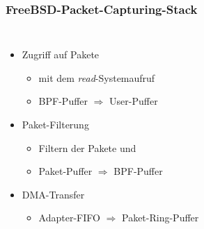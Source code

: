 \documentclass{beamer}
\begin{document}
\begin{frame}
\frametitle{FreeBSD-Packet-Capturing-Stack}
\begin{columns}
\vspace{0em}
\begin{itemize}
\item <5->[3.]Zugriff auf Pakete
	\begin{itemize}
		\item <5->mit dem \emph{read}-Systemaufruf
		\item <5->BPF-Puffer $\Rightarrow$ 	User-Puffer	\newline
	\end{itemize}
\item <3->[2.]Paket-Filterung
	\begin{itemize}
		\item <4->Filtern der Pakete und 
		\item <4->Paket-Puffer $\Rightarrow$ BPF-Puffer \newline
	\end{itemize}
\item <1->[1.]DMA-Transfer
	\begin{itemize}
		\item <1->Adapter-FIFO $\Rightarrow$ Paket-Ring-Puffer
	\end{itemize}
\end{itemize}
\vspace{-2em}
\begin{figure}

\end{figure}
\end{columns}
\end{frame}
\end{document}
